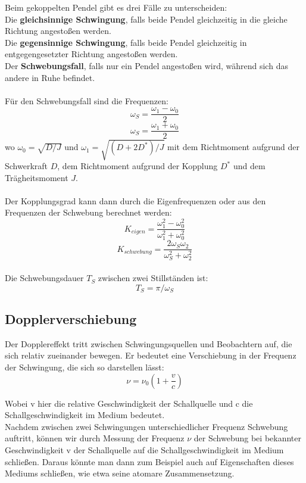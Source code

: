 \documentclass{article}
\begin{document}
Beim gekoppelten Pendel gibt es drei Fälle zu unterscheiden:\\
Die \textbf{gleichsinnige Schwingung}, falls beide Pendel gleichzeitig in die gleiche Richtung angestoßen werden.\\
Die \textbf{gegensinnige Schwingung}, falls beide Pendel gleichzeitig in entgegengesetzter Richtung angestoßen werden.\\
Der \textbf{Schwebungsfall}, falls nur ein Pendel angestoßen wird, während sich das andere in Ruhe befindet.\\
\\
Für den Schwebungsfall sind die Frequenzen:
$$\omega_S=\frac{\omega_1 - \omega_0}{2}$$
$$\omega_S=\frac{\omega_1 + \omega_0}{2}$$
wo $\omega_0=\sqrt{D/J}$ und $\omega_1=\sqrt{(D+2D^*)/J}$ mit dem Richtmoment aufgrund der Schwerkraft $D$, dem Richtmoment aufgrund der Kopplung $D^*$ und dem Trägheitsmoment $J$.\\
\\
Der Kopplungsgrad kann dann durch die Eigenfrequenzen oder aus den Frequenzen der Schwebung berechnet werden:
$$K_{eigen}=\frac{\omega_1^2-\omega_0^2}{\omega_1^2+\omega_0^2}$$
$$K_{schwebung}=\frac{2\omega_S \omega_2}{\omega_S^2 + \omega_2^2}$$
\\
Die Schwebungsdauer $T_S$ zwischen zwei Stillständen ist:
$$T_S=\pi/\omega_S$$

\subsection{Dopplerverschiebung}
Der Dopplereffekt tritt zwischen Schwingungsquellen und Beobachtern auf, die sich relativ zueinander bewegen. Er bedeutet eine Verschiebung in der Frequenz der Schwingung, die sich so darstellen lässt:\\

\begin{equation}
\label{Dopplereffekt}
\nu = \nu_0(1+ \frac{v}{c})
\end{equation}

Wobei v hier die relative Geschwindigkeit der Schallquelle und c die Schallgeschwindigkeit im Medium bedeutet. \\

Nachdem zwischen zwei Schwingungen unterschiedlicher Frequenz Schwebung auftritt, können wir durch Messung der Frequenz $\nu$ der Schwebung bei bekannter Geschwindigkeit v der Schallquelle auf die Schallgeschwindigkeit im Medium schließen. Daraus könnte man dann zum Beispiel auch auf Eigenschaften dieses Mediums schließen, wie etwa seine atomare Zusammensetzung.\\
\end{document}
